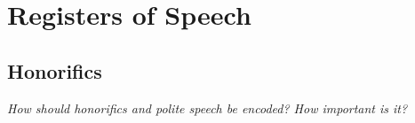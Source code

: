 \documentclass[grammar]{subfiles}
\begin{document}
  \chapter{Registers of Speech}
  \label{ch:registers}

  \section{Honorifics}
  \label{sec:reg_honorifics}

  \emph{How should honorifics and polite speech be encoded? How important is it?}

\end{document}
